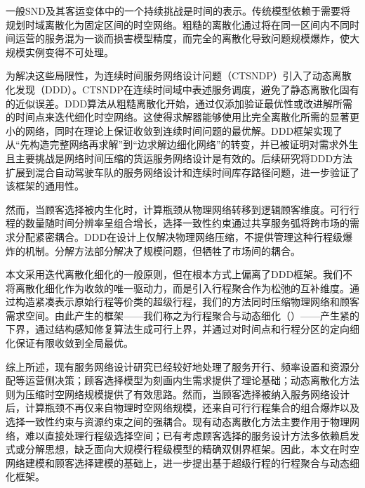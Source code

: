 一般SND及其客运变体中的一个持续挑战是时间的表示。传统模型依赖于需要将规划时域离散化为固定区间的时空网络。粗糙的离散化通过将在同一区间内不同时间运营的服务混为一谈而损害模型精度，而完全的离散化导致问题规模爆炸，使大规模实例变得不可处理。

为解决这些局限性，\citet{boland2017continuous}为连续时间服务网络设计问题（CTSNDP）引入了动态离散化发现（DDD）。CTSNDP在连续时间域中表述服务调度，避免了静态离散化固有的近似误差\citep{boland2019price}。DDD算法从粗糙离散化开始，通过仅添加验证最优性或改进解所需的时间点来迭代细化时空网络。这使得求解器能够使用比完全离散化所需的显著更小的网络，同时在理论上保证收敛到连续时间问题的最优解。DDD框架实现了从“先构造完整网络再求解”到“边求解边细化网络”的转变，并已被证明对需求外生且主要挑战是网络时间压缩的货运服务网络设计是有效的。后续研究将DDD方法扩展到混合自动驾驶车队的服务网络设计\citep{scherr2020dynamic}和连续时间库存路径问题\citep{lagos2022dynamic}，进一步验证了该框架的通用性。

然而，当顾客选择被内生化时，计算瓶颈从物理网络转移到逻辑顾客维度。可行行程的数量随时间分辨率呈组合增长，选择一致性约束通过共享服务弧将跨市场的需求分配紧密耦合。DDD在设计上仅解决物理网络压缩，不提供管理这种行程级爆炸的机制。分解方法\citep{yan2022choice}部分解决了规模问题，但牺牲了市场间的耦合。

本文采用迭代离散化细化的一般原则，但在根本方式上偏离了DDD框架。我们不将离散化细化作为收敛的唯一驱动力，而是引入行程聚合作为松弛的互补维度。通过构造紧凑表示原始行程等价类的超级行程，我们的方法同时压缩物理网络和顾客需求空间。由此产生的框架——我们称之为行程聚合与动态细化（\algoNotation）——产生紧的下界，通过结构感知修复算法生成可行上界，并通过对时间点和行程分区的定向细化保证有限收敛到全局最优。

综上所述，现有服务网络设计研究已经较好地处理了服务开行、频率设置和资源分配等运营侧决策；顾客选择模型为刻画内生需求提供了理论基础；动态离散化方法则为压缩时空网络规模提供了有效思路。然而，当顾客选择被纳入服务网络设计后，计算瓶颈不再仅来自物理时空网络规模，还来自可行行程集合的组合爆炸以及选择一致性约束与资源约束之间的强耦合。现有动态离散化方法主要作用于物理网络，难以直接处理行程级选择空间；已有考虑顾客选择的服务设计方法多依赖启发式或分解思想，缺乏面向大规模行程级模型的精确双侧界框架。因此，本文在时空网络建模和顾客选择建模的基础上，进一步提出基于超级行程的行程聚合与动态细化框架。

